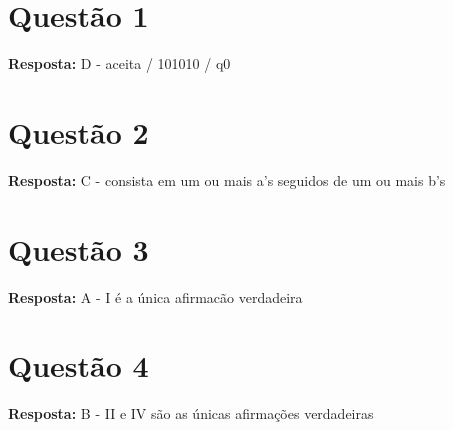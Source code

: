 \documentclass[a4paper, 12pt]{article}
\begin{document}
\newpage
\tableofcontents
\thispagestyle{empty}

\newpage
{}

\section{Questão 1}
\textbf{Resposta:} D - aceita / 101010 / q0 

\section{Questão 2}
\textbf{Resposta:} C - consista em um ou mais a’s seguidos de um ou mais b’s

\section{Questão 3}
\textbf{Resposta:} A - I é a única afirmacão verdadeira

\section{Questão 4}
\textbf{Resposta:} B - II e IV são as únicas afirmações verdadeiras
\end{document}
